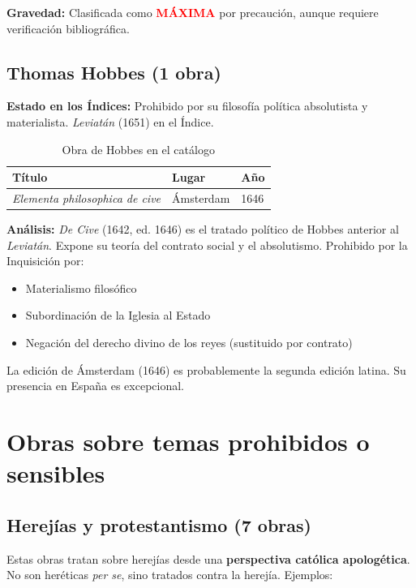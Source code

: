 \documentclass[12pt,a4paper]{article}
\begin{document}
\textbf{Gravedad:} Clasificada como \textcolor{red}{\textbf{MÁXIMA}} por precaución, aunque requiere verificación bibliográfica.

\subsection{Thomas Hobbes (1 obra)}

\textbf{Estado en los Índices:} Prohibido por su filosofía política absolutista y materialista. \textit{Leviatán} (1651) en el Índice.

\begin{table}[h]
\centering
\caption{Obra de Hobbes en el catálogo}
\begin{tabular}{p{8cm}p{2.5cm}p{2cm}}
\toprule
\textbf{Título} & \textbf{Lugar} & \textbf{Año} \\
\midrule
\textit{Elementa philosophica de cive} & Ámsterdam & 1646 \\
\bottomrule
\end{tabular}
\end{table}

\textbf{Análisis:} \textit{De Cive} (1642, ed. 1646) es el tratado político de Hobbes anterior al \textit{Leviatán}. Expone su teoría del contrato social y el absolutismo. Prohibido por la Inquisición por:

\begin{itemize}
    \item Materialismo filosófico
    \item Subordinación de la Iglesia al Estado
    \item Negación del derecho divino de los reyes (sustituido por contrato)
\end{itemize}

La edición de Ámsterdam (1646) es probablemente la segunda edición latina. Su presencia en España es excepcional.

\section{Obras sobre temas prohibidos o sensibles}

\subsection{Herejías y protestantismo (7 obras)}

Estas obras tratan sobre herejías desde una \textbf{perspectiva católica apologética}. No son heréticas \textit{per se}, sino tratados contra la herejía. Ejemplos:
\end{document}
